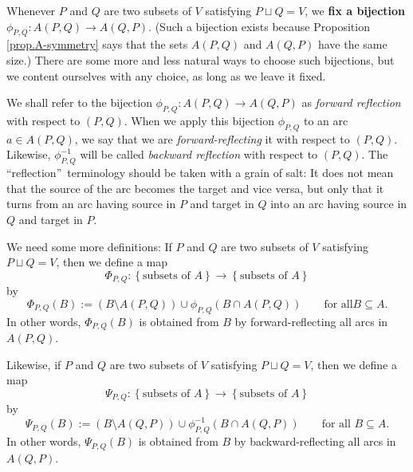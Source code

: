 \documentclass[numbers=enddot,12pt,final,onecolumn,notitlepage]{scrartcl}%
\theoremstyle{definition}
\theoremstyle{plainsl}
\begin{document}
Whenever $P$ and $Q$ are two subsets of $V$ satisfying $P\sqcup Q=V$, we
\textbf{fix a bijection} $\phi_{P,Q}:A\left(  P,Q\right)  \rightarrow A\left(
Q,P\right)  $. (Such a bijection exists because Proposition
\ref{prop.A-symmetry} says that the sets $A\left(  P,Q\right)  $ and $A\left(
Q,P\right)  $ have the same size.) There are some more and less natural ways
to choose such bijections, but we content ourselves with any choice, as long
as we leave it fixed.

We shall refer to the bijection $\phi_{P,Q}:A\left(  P,Q\right)  \rightarrow
A\left(  Q,P\right)  $ as \emph{forward reflection} with respect to $\left(
P,Q\right)  $. When we apply this bijection $\phi_{P,Q}$ to an arc $a\in
A\left(  P,Q\right)  $, we say that we are \emph{forward-reflecting} it with
respect to $\left(  P,Q\right)  $. Likewise, $\phi_{P,Q}^{-1}$ will be called
\emph{backward reflection} with respect to $\left(  P,Q\right)  $. The
\textquotedblleft reflection\textquotedblright\ terminology should be taken
with a grain of salt: It does not mean that the source of the arc becomes the
target and vice versa, but only that it turns from an arc having source in $P$
and target in $Q$ into an arc having source in $Q$ and target in $P$.

We need some more definitions: If $P$ and $Q$ are two subsets of $V$
satisfying $P\sqcup Q=V$, then we define a map%
\[
\Phi_{P,Q}:\left\{  \text{subsets of }A\right\}  \rightarrow\left\{
\text{subsets of }A\right\}
\]
by%
\[
\Phi_{P,Q}\left(  B\right)  :=\left(  B\setminus A\left(  P,Q\right)  \right)
\cup\phi_{P,Q}\left(  B\cap A\left(  P,Q\right)  \right)  \qquad\text{for all
}B\subseteq A.
\]
In other words, $\Phi_{P,Q}\left(  B\right)  $ is obtained from $B$ by
forward-reflecting all arcs in $A\left(  P,Q\right)  $.

Likewise, if $P$ and $Q$ are two subsets of $V$ satisfying $P\sqcup Q=V$, then
we define a map%
\[
\Psi_{P,Q}:\left\{  \text{subsets of }A\right\}  \rightarrow\left\{
\text{subsets of }A\right\}
\]
by%
\[
\Psi_{P,Q}\left(  B\right)  :=\left(  B\setminus A\left(  Q,P\right)  \right)
\cup\phi_{P,Q}^{-1}\left(  B\cap A\left(  Q,P\right)  \right)  \qquad\text{for
all }B\subseteq A.
\]
In other words, $\Psi_{P,Q}\left(  B\right)  $ is obtained from $B$ by
backward-reflecting all arcs in $A\left(  Q,P\right)  $.
\end{document}
